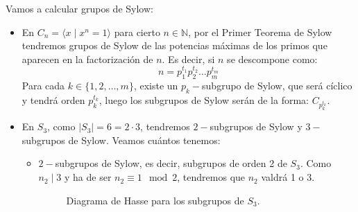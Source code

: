 \begin{ejemplo}
    Vamos a calcular grupos de Sylow:
    \begin{itemize}
        \item En $C_n = \langle x \mid x^n = 1 \rangle $ para cierto $n\in \mathbb{N}$, por el Primer Teorema de Sylow tendremos grupos de Sylow de las potencias máximas de los primos que aparecen en la factorización de $n$. Es decir, si $n$ se descompone como:
            \begin{equation*}
                n = p_1^{t_1} p_2^{t_2} \ldots p_m^{t_m}
            \end{equation*}
            Para cada $k \in \{1,2,\ldots,m\}$, existe un $p_k-$subgrupo de Sylow, que será cíclico y tendrá orden $p_k^{t_k}$, luego los subgrupos de Sylow serán de la forma: $C_{p_k^{t_k}}$.
        \item En $S_3$, como $|S_3| = 6 = 2\cdot 3$, tendremos $2-$subgrupos de Sylow y $3-$subgrupos de Sylow. Veamos cuántos tenemos:
            \begin{itemize}
                \item $2-$subgrupos de Sylow, es decir, subgrupos de orden 2 de $S_3$. Como $n_2 \mid 3$ y ha de ser $n_2\equiv 1 \mod 2$, tendremos que $n_2$ valdrá 1 o 3.

                    \begin{figure}[H]
                        \centering
                        \caption{Diagrama de Hasse para los subgrupos de $S_3$.}
                    \end{figure}


\end{itemize}
\end{itemize}
\end{ejemplo}
